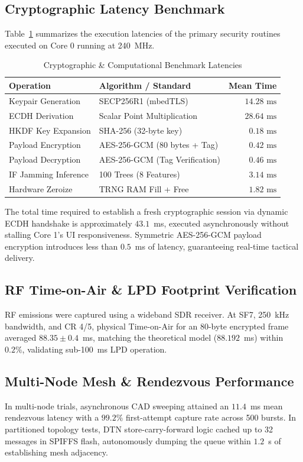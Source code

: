 \documentclass[conference]{IEEEtran}
\begin{document}
\subsection{Cryptographic Latency Benchmark}
Table~\ref{tab:benchmarks} summarizes the execution latencies of the primary security routines executed on Core 0 running at 240~MHz.

\begin{table}[!htbp]
\caption{Cryptographic \& Computational Benchmark Latencies}
\label{tab:benchmarks}
\centering
\footnotesize
\begin{tabularx}{\columnwidth}{@{}p{2.6cm} X r@{}}
\toprule
\textbf{Operation} & \textbf{Algorithm / Standard} & \textbf{Mean Time} \\
\midrule
Keypair Generation & SECP256R1 (mbedTLS) & $14.28\text{ ms}$ \\
ECDH Derivation & Scalar Point Multiplication & $28.64\text{ ms}$ \\
HKDF Key Expansion & SHA-256 (32-byte key) & $0.18\text{ ms}$ \\
Payload Encryption & AES-256-GCM (80 bytes + Tag) & $0.42\text{ ms}$ \\
Payload Decryption & AES-256-GCM (Tag Verification) & $0.46\text{ ms}$ \\
IF Jamming Inference & 100 Trees (8 Features) & $3.14\text{ ms}$ \\
Hardware Zeroize & TRNG RAM Fill + Free & $1.82\text{ ms}$ \\
\bottomrule
\end{tabularx}
\end{table}

The total time required to establish a fresh cryptographic session via dynamic ECDH handshake is approximately $43.1$~ms, executed asynchronously without stalling Core 1's UI responsiveness. Symmetric AES-256-GCM payload encryption introduces less than $0.5$~ms of latency, guaranteeing real-time tactical delivery.

\subsection{RF Time-on-Air \& LPD Footprint Verification}
RF emissions were captured using a wideband SDR receiver. At SF7, 250~kHz bandwidth, and CR 4/5, physical Time-on-Air for an 80-byte encrypted frame averaged $88.35\pm 0.4$~ms, matching the theoretical model ($88.192$~ms) within $0.2\%$, validating sub-100~ms LPD operation.

\subsection{Multi-Node Mesh \& Rendezvous Performance}
In multi-node trials, asynchronous CAD sweeping attained an $11.4$~ms mean rendezvous latency with a $99.2\%$ first-attempt capture rate across 500 bursts. In partitioned topology tests, DTN store-carry-forward logic cached up to 32 messages in SPIFFS flash, autonomously dumping the queue within $1.2$~s of establishing mesh adjacency.
\end{document}
